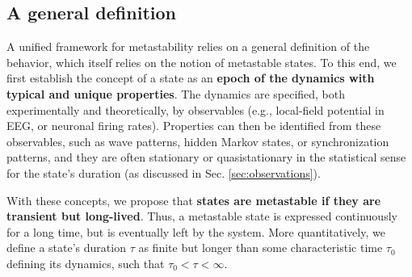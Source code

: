 \documentclass[reprint,superscriptaddress,showpacs,amsmath,amssymb,aps,floatfix,nolongbibliography]{revtex4-2}
\theoremstyle{definition}
\newcommand{\Emph}[1]{\textbf{#1}}
\begin{document}
\subsection{A general definition}
\label{sec:definitions}
A unified framework for metastability relies on a general definition of the behavior, which itself relies on the notion of metastable states. To this end, we first establish the concept of a state as an \textbf{epoch of the dynamics with typical and unique properties}. The dynamics are specified, both experimentally and theoretically, by observables (e.g., local-field potential in EEG, or neuronal firing rates). Properties can then be identified from these observables, such as wave patterns, hidden Markov states, or synchronization patterns, and they are often stationary or quasistationary in the statistical sense for the state's duration \cite{michel2017eeg, brinkman2022metastable, mazor2005transient} (as discussed in Sec. \ref{sec:observations}). 

With these concepts, we propose that \Emph{states are metastable if they are transient but long-lived}. Thus, a metastable state is expressed continuously for a long time, but is eventually left by the system. More quantitatively, we define a state's duration $\tau$ as finite but longer than some characteristic time $\tau_0$ defining its dynamics, such that $\tau_0 < \tau < \infty$.
\end{document}
